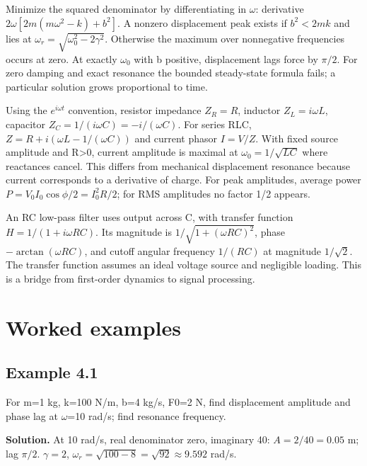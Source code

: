 \documentclass[11pt,a4paper,openany]{book}
\begin{document}
Minimize the squared denominator by differentiating in $\omega$: derivative $2\omega[2m(m\omega^2-k)+b^2]$. A nonzero displacement peak exists if $b^2<2mk$ and lies at $\omega_r=\sqrt{\omega_0^2-2\gamma^2}$. Otherwise the maximum over nonnegative frequencies occurs at zero. At exactly $\omega_0$ with b positive, displacement lags force by $\pi/2$. For zero damping and exact resonance the bounded steady-state formula fails; a particular solution grows proportional to time.

Using the $e^{i\omega t}$ convention, resistor impedance $Z_R=R$, inductor $Z_L=i\omega L$, capacitor $Z_C=1/(i\omega C)=-i/(\omega C)$. For series RLC, $Z=R+i(\omega L-1/(\omega C))$ and current phasor $I=V/Z$. With fixed source amplitude and R>0, current amplitude is maximal at $\omega_0=1/\sqrt{LC}$ where reactances cancel. This differs from mechanical displacement resonance because current corresponds to a derivative of charge. For peak amplitudes, average power $P=V_0I_0\cos\phi/2=I_0^2R/2$; for RMS amplitudes no factor 1/2 appears.

An RC low-pass filter uses output across C, with transfer function $H=1/(1+i\omega RC)$. Its magnitude is $1/\sqrt{1+(\omega RC)^2}$, phase $-\arctan(\omega RC)$, and cutoff angular frequency $1/(RC)$ at magnitude $1/\sqrt2$. The transfer function assumes an ideal voltage source and negligible loading. This is a bridge from first-order dynamics to signal processing.
\begin{center}
\end{center}
\section{Worked examples}
\subsection*{Example 4.1}
For m=1 kg, k=100 N/m, b=4 kg/s, F0=2 N, find displacement amplitude and phase lag at \ensuremath{\omega}=10 rad/s; find resonance frequency.

\textbf{Solution.} At 10 rad/s, real denominator zero, imaginary 40: $A=2/40=0.05$ m; lag $\pi/2$. $\gamma=2$, $\omega_r=\sqrt{100-8}=\sqrt{92}\approx9.592$ rad/s.
\end{document}
